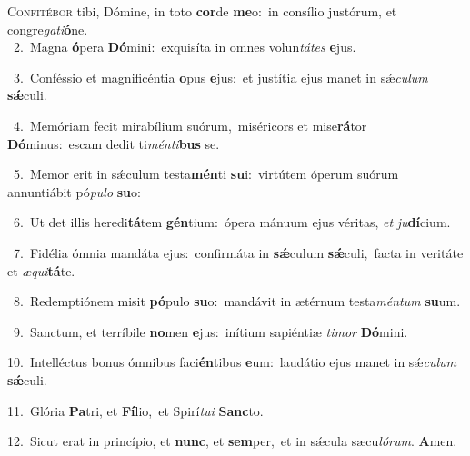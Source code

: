 \lettrine{\initial\textcolor{\initialcolor}{C}}{onfitébor} tibi, Dómine, in toto \textbf{cor}\-de \textbf{me}\-o:~\star in consílio justórum, et congre\-\textit{ga}\-\textit{ti}\textbf{ó}ne.\\
{\numbfont\textcolor{\numbcolor}{~2.}}~Magna \textbf{ó}\-pera \textbf{Dó}\-mini:~\star exquisíta in omnes volun\-\textit{tá}\-\textit{tes} \textbf{e}\-jus.\par
{\numbfont\textcolor{\numbcolor}{~3.}}~Conféssio et magnificéntia \textbf{o}\-pus \textbf{e}\-jus:~\star et justítia ejus manet in sǽ\-\textit{cu}\-\textit{lum} \textbf{sǽ}\-culi.\par
{\numbfont\textcolor{\numbcolor}{~4.}}~Memóriam fecit mirabílium suórum,~\dagger miséricors et mise\-\textbf{rá}\-tor \textbf{Dó}\-minus:~\star escam dedit ti\-\textit{mén}\-\textit{ti}\textbf{bus} se.\par
{\numbfont\textcolor{\numbcolor}{~5.}}~Memor erit in sǽculum testa\-\textbf{mén}\-ti \textbf{su}\-i:~\star virtútem óperum suórum annuntiábit pó\-\textit{pu}\-\textit{lo} \textbf{su}\-o:\par
{\numbfont\textcolor{\numbcolor}{~6.}}~Ut det illis heredi\-\textbf{tá}\-tem \textbf{gén}\-tium:~\star ópera mánuum ejus véritas, \textit{et} \textit{ju}\-\textbf{dí}cium.\par
{\numbfont\textcolor{\numbcolor}{~7.}}~Fidélia ómnia mandáta ejus:~\dagger confirmáta in \textbf{sǽ}\-culum \textbf{sǽ}\-culi,~\star facta in veritáte et \textit{æ}\-\textit{qui}\textbf{tá}te.\par
{\numbfont\textcolor{\numbcolor}{~8.}}~Redemptiónem misit \textbf{pó}\-pulo \textbf{su}\-o:~\star mandávit in ætérnum testa\-\textit{mén}\-\textit{tum} \textbf{su}\-um.\par
{\numbfont\textcolor{\numbcolor}{~9.}}~Sanctum, et terríbile \textbf{no}\-men \textbf{e}\-jus:~\star inítium sapiéntiæ \textit{ti}\-\textit{mor} \textbf{Dó}\-mini.\par
{\numbfont\textcolor{\numbcolor}{10.}}~Intelléctus bonus ómnibus faci\-\textbf{én}\-tibus \textbf{e}\-um:~\star laudátio ejus manet in sǽ\-\textit{cu}\-\textit{lum} \textbf{sǽ}\-culi.\par
{\numbfont\textcolor{\numbcolor}{11.}}~Glória \textbf{Pa}\-tri, et \textbf{Fí}\-lio,~\star et Spirí\-\textit{tu}\-\textit{i} \textbf{Sanc}\-to.\par
{\numbfont\textcolor{\numbcolor}{12.}}~Sicut erat in princípio, et \textbf{nunc}\-, et \textbf{sem}\-per,~\star et in sǽcula sæcu\-\textit{ló}\-\textit{rum}. \textbf{A}\-men.\par
